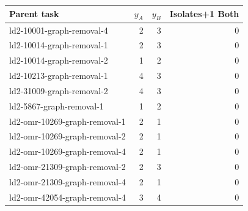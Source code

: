 \begin{tabular}{@{}lrrr@{}}
\toprule
Parent task & $y_A$ & $y_B$ & Isolates+1 Both\\
\midrule
ld2-10001-graph-removal-4 & 2 & 3 & 0\\
ld2-10014-graph-removal-1 & 2 & 3 & 0\\
ld2-10014-graph-removal-2 & 1 & 2 & 0\\
ld2-10213-graph-removal-1 & 4 & 3 & 0\\
ld2-31009-graph-removal-2 & 4 & 3 & 0\\
ld2-5867-graph-removal-1 & 1 & 2 & 0\\
ld2-omr-10269-graph-removal-1 & 2 & 1 & 0\\
ld2-omr-10269-graph-removal-2 & 2 & 1 & 0\\
ld2-omr-10269-graph-removal-4 & 2 & 1 & 0\\
ld2-omr-21309-graph-removal-2 & 2 & 3 & 0\\
ld2-omr-21309-graph-removal-4 & 2 & 1 & 0\\
ld2-omr-42054-graph-removal-4 & 3 & 4 & 0\\
\bottomrule
\end{tabular}
